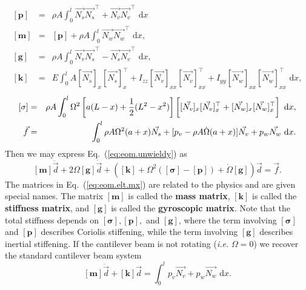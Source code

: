 \begin{eqnarray}
\mathbf{[p]} &=& \rho A\int_0^l\vec{N_s}\vec{N_s}^\top+\vec{N_v}\vec{N_v}^\top\text{ d}x \\
\mathbf{[m]} &=& \mathbf{[p]}+\rho A\int_0^l\vec{N_w}\vec{N_w}^\top\text{ d}x, \\
\mathbf{[g]} &=& \rho A\int_0^l\vec{N_v}\vec{N_s}^\top-\vec{N_s}\vec{N_v}^\top\text{ d}x ,\\
\mathbf{[k]} &=& E\int_0^lA[\vec{N_s}]_x[\vec{N_s}]_x^\top+I_{zz}[\vec{N_v}]_{xx}[\vec{N_v}]_{xx}^\top+I_{yy}[\vec{N_w}]_{xx}[\vec{N_w}]_{xx}^\top\text{ d}x, 
\end{eqnarray}
\begin{eqnarray}
\mathbf{[\sigma]} &=& \rho A\int_0^l \Omega^2\left[a(L-x)+\frac{1}{2}(L^2-x^2)\right]\left[\vphantom{\frac{0}{0}}[\vec{N_v}]_{x}[\vec{N_v}]_{x}^\top+[\vec{N_w}]_{x}[\vec{N_w}]_{x}^\top\right] \text{ d}x, \\
\vec{f} &=& \int_0^l \rho A\Omega^2(a+x)\vec{N_s}+[p_v - \rho A\dot\Omega(a+x)]\vec{N_v}+p_w\vec{N_w}\text{ d}x.
\end{eqnarray}
Then we may express Eq.~(\ref{eq:eom.unwieldy}) as
\begin{equation}
\mathbf{[m]}\ddot{\vec d} +2\Omega\mathbf{[g]}\dot{\vec d} + (\mathbf{[k]}+\Omega^2(\mathbf{[\sigma]}-\mathbf{[p]})+\dot\Omega\mathbf{[g]} )\vec d = \vec{f}.
\label{eq:eom.elt.mx}
\end{equation}
The matrices in Eq.~(\ref{eq:eom.elt.mx}) are related to the physics and are given special names. The matrix $\mathbf{[m]}$ is called the \textbf{mass matrix}, $\mathbf{[k]}$ is called the \textbf{stiffness matrix}, and $\mathbf{[g]}$ is called the \textbf{gyroscopic matrix}. Note that the total stiffness depends on $\mathbf{[\sigma]},\mathbf{[p]},$ and $\mathbf{[g]}$, where the term involving $\mathbf{[\sigma]}$ and $\mathbf{[p]}$ describes Coriolis stiffening, while the term involving $\mathbf{[g]}$ describes inertial stiffening. If the cantilever beam is not rotating (\emph{i.e.} $\Omega = 0$) we recover the standard cantilever beam system
\begin{equation}
\mathbf{[m]}\ddot{\vec d}+\mathbf{[k]}\vec d = \int_0^l p_v\vec{N_v}+p_w\vec{N_w}\text{ d}x.
\end{equation}

